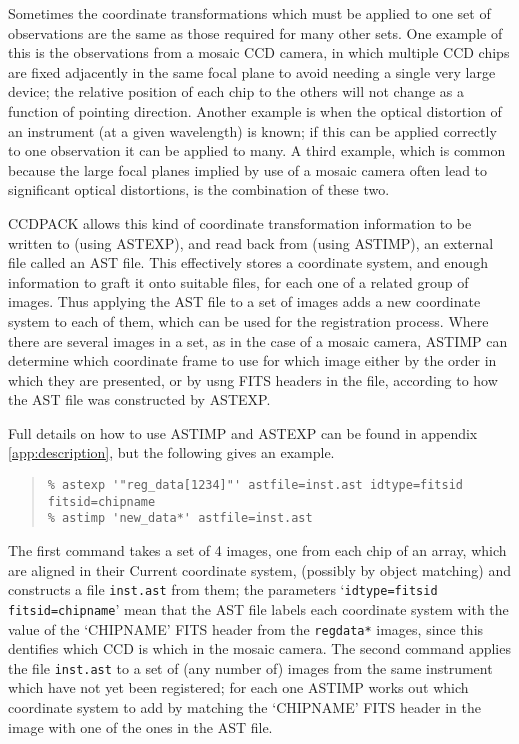 \documentclass[twoside,11pt]{article}
\newcommand{\hyperref}[4]{#2\ref{#4}#3}
\newcommand{\htmlref}[2]{#1}
\renewcommand{\_}{\texttt{\symbol{95}}}
\newenvironment{myquote}{\begin{quote}\begin{small}}{\end{small}\end{quote}}
\newcommand{\text}[1]{{\small \tt #1}}
\newcommand{\routine}[1]{{\sc #1}}
\newcommand{\xroutine}[1]{\htmlref{{\sc #1}}{#1}}
\begin{document}
Sometimes the coordinate transformations which must be applied
to one set of observations are the same as those
required for many other sets.
One example of this is the observations from a mosaic
CCD camera, in which multiple CCD chips are fixed adjacently 
in the same focal plane to avoid needing a single very large device;
the relative position of each chip to the others 
will not change as a function of pointing direction.
Another example is when the optical distortion of an instrument
(at a given wavelength) is known; if this can be applied
correctly to one observation it can be applied to many.
A third example, which is common because the large focal planes
implied by use of a mosaic camera often lead to significant
optical distortions, is the combination of these two.

CCDPACK allows this kind of coordinate transformation information to 
be written to (using \routine{ASTEXP}), 
and read back from (using \routine{ASTIMP}),
an external file called an AST file.
This effectively stores a coordinate system, and enough information
to graft it onto suitable files, for each one of a related group
of images.
Thus applying the AST file to a set of images adds a new 
coordinate system to
each of them, which can be used for the registration process.
Where there are several images in a set, as in the case of 
a mosaic camera, \routine{ASTIMP} can determine which coordinate frame to
use for which image either by the order in which they are presented,
or by usng FITS headers in the file, 
according to how the AST file was constructed by \routine{ASTEXP}.

Full details on how to use \xroutine{ASTIMP} and \xroutine{ASTEXP}
can be found in \hyperref{an appendix}{appendix }{}{app:description},
but the following gives an example.
\begin{myquote}
\begin{verbatim}
% astexp '"reg_data[1234]"' astfile=inst.ast idtype=fitsid fitsid=chipname
% astimp 'new_data*' astfile=inst.ast
\end{verbatim}
\end{myquote}
The first command takes a set of 4 images, one from each chip of an array,
which are aligned in their Current coordinate system, 
(possibly by object matching)
and constructs a file \text{inst.ast} from them;
the parameters `\text{idtype=fitsid fitsid=chipname}' 
mean that the AST file labels each coordinate system with the
value of the `CHIPNAME' FITS header from the \text{reg\_data*} images,
since this dentifies which CCD is which in the mosaic camera.
The second command applies the file \text{inst.ast}
to a set of (any number of) images from the same 
instrument which have not yet been registered;
for each one \routine{ASTIMP} works out which coordinate system to 
add by matching the `CHIPNAME' FITS header in the image with one of 
the ones in the AST file.
\end{document}
